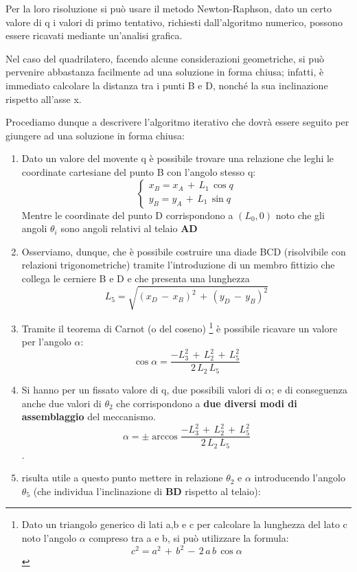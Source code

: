 	Per la loro risoluzione si può usare il metodo Newton-Raphson, dato un certo valore di q i valori di primo tentativo, richiesti dall'algoritmo numerico, possono essere ricavati mediante un'analisi grafica.
	
	Nel caso del quadrilatero, facendo alcune considerazioni geometriche, si può pervenire abbastanza facilmente ad una soluzione in forma chiusa; infatti, è immediato calcolare la distanza tra i punti B e D, nonché la sua inclinazione rispetto all'asse x.\newline
	
	Procediamo dunque a descrivere l'algoritmo iterativo che dovrà essere seguito per giungere ad una soluzione in forma chiusa:
	\begin{enumerate}
		\item Dato un valore del movente q è possibile trovare una relazione che leghi le coordinate cartesiane del punto B con l'angolo stesso q:
		\[
		\begin{cases}
			x_B = x_A\,+\,L_1\,\cos{q}\\
			y_B = y_A\,+\,L_1\,\sin{q}
		\end{cases}
		\] 
		Mentre le coordinate del punto D corrispondono a $(L_0, 0)$ noto che gli angoli $\theta_i$ sono angoli relativi al telaio $\mathbf{AD}$
		\item Osserviamo, dunque, che è possibile costruire una diade BCD (risolvibile con relazioni trigonometriche) tramite l'introduzione di un membro fittizio che collega le cerniere B  e D e che presenta una lunghezza
		\[
		L_5 = \sqrt{(x_D\,-\,x_B)^2\,+\,(y_D\,-\,y_B)^2}
		\]
		\item Tramite il teorema di Carnot (o del coseno)%
		\footnote{Dato un triangolo generico di lati a,b e c per calcolare la lunghezza del lato c noto l'angolo $\alpha$ compreso tra a e b, si può utilizzare la formula:
		\[c^2 = a^2\,+\,b^2\,-\,2\,a\,b\,\cos{\alpha}\]}
		 è possibile ricavare un valore per l'angolo $\alpha$:
		 \[
		 \cos{\alpha} = \frac{-L_3^2\,+\,L_2^2\,+\,L_5^2}{2\,L_2\,L_5}
		\]
		 \item Si hanno per un fissato valore di q, due possibili valori di $\alpha$; e di conseguenza anche due valori di $\theta_2$ che corrispondono a \textbf{due diversi modi di assemblaggio} del meccanismo.
		 \[\alpha = \pm \arccos{ \frac{-L_3^2\,+\,L_2^2\,+\,L_5^2}{2\,L_2\,L_5}}\].
		 \item risulta utile a questo punto mettere in relazione $\theta_2$ e $\alpha$ introducendo l'angolo $\theta_5$ (che individua l'inclinazione di $\mathbf{BD}$ rispetto al telaio):
		 

\end{enumerate}
